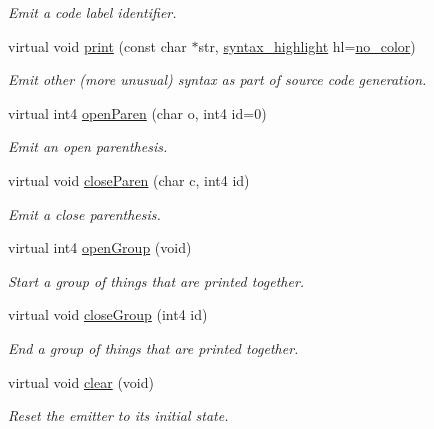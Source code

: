 \begin{DoxyCompactItemize}
\begin{DoxyCompactList}\small\item\em Emit a code label identifier. \end{DoxyCompactList}\item 
virtual void \mbox{\hyperlink{class_emit_xml_a287234536199377d46179762127875ac}{print}} (const char $\ast$str, \mbox{\hyperlink{class_emit_xml_a7c3577436da429c3c75f4b82cac6864f}{syntax\+\_\+highlight}} hl=\mbox{\hyperlink{class_emit_xml_a7c3577436da429c3c75f4b82cac6864facf637f33b975ebd31bda638a66d5b052}{no\+\_\+color}})
\begin{DoxyCompactList}\small\item\em Emit other (more unusual) syntax as part of source code generation. \end{DoxyCompactList}\item 
virtual int4 \mbox{\hyperlink{class_emit_xml_a4f7e781436dde8754ae5f52c9c5edc47}{open\+Paren}} (char o, int4 id=0)
\begin{DoxyCompactList}\small\item\em Emit an open parenthesis. \end{DoxyCompactList}\item 
virtual void \mbox{\hyperlink{class_emit_xml_a3442a3f23a65cfcf073d57cf64733493}{close\+Paren}} (char c, int4 id)
\begin{DoxyCompactList}\small\item\em Emit a close parenthesis. \end{DoxyCompactList}\item 
virtual int4 \mbox{\hyperlink{class_emit_xml_a7f370f4d245182bc6132885a0e8b4d71}{open\+Group}} (void)
\begin{DoxyCompactList}\small\item\em Start a group of things that are printed together. \end{DoxyCompactList}\item 
virtual void \mbox{\hyperlink{class_emit_xml_ade0028d33afa198f7211e21c9c673231}{close\+Group}} (int4 id)
\begin{DoxyCompactList}\small\item\em End a group of things that are printed together. \end{DoxyCompactList}\item 
virtual void \mbox{\hyperlink{class_emit_xml_a9f19ca4c4bb59ec6b77a58c0d2f783d7}{clear}} (void)
\begin{DoxyCompactList}\small\item\em Reset the emitter to its initial state. \end{DoxyCompactList}\item 

\end{DoxyCompactItemize}
